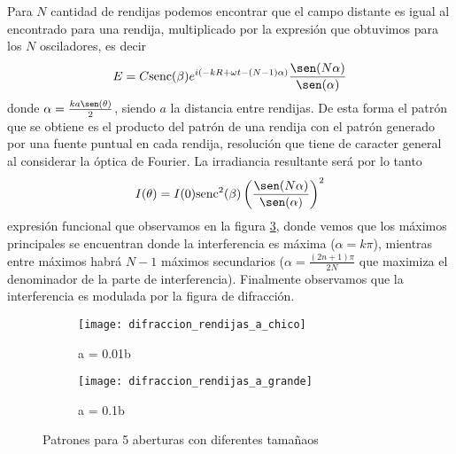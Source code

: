 \documentclass[a4paper]{article}
\numberwithin{equation}{section}
\begin{document}
	Para $N$ cantidad de rendijas podemos encontrar que el campo distante es igual al encontrado para una rendija, multiplicado por la expresión que obtuvimos para los $N$ osciladores, es decir
	\begin{equation}
		E = C \text{senc}(\beta) e^{i(-k R + \omega t - (N - 1)\alpha)} \frac{\sen(N \alpha)}{\sen(\alpha)}
		\label{eq:difraccion_red_rendijas}
	\end{equation}
	donde $\alpha = \frac{k a \sen(\theta)}{2}$, siendo $a$ la distancia entre rendijas. De esta forma el patrón que se obtiene es el producto del patrón de una rendija con el patrón generado por una fuente puntual en cada rendija, resolución que tiene de caracter general al considerar la óptica de Fourier. La irradiancia resultante será por lo tanto
	\begin{equation}
		I(\theta) = I(0) \text{senc}^2(\beta) \left(\frac{\sen(N\alpha)}{\sen(\alpha)}\right)^2
		\label{eq:difraccion_red_rendijas_irradiancia}
	\end{equation}
	expresión funcional que observamos en la figura \ref{fig:difraccion_red_rendijas_irradiancia}, donde vemos que los máximos principales se encuentran donde la interferencia es máxima ($\alpha = k \pi$), mientras entre máximos habrá $N - 1$ máximos secundarios ($\alpha = \frac{(2 n + 1)\pi}{2N}$ que maximiza el denominador de la parte de interferencia). Finalmente observamos que la interferencia es modulada por la figura de difracción.
	
	\begin{figure}[H]
        \centering
        \begin{subfigure}[b]{0.3\textwidth}
                \centering
                \texttt{[image: difraccion\_rendijas\_a\_chico]}
                \caption{a = 0.01b}
                \label{fig:difraccion_red_rendija_a_chico}
        \end{subfigure}
        \qquad
        \begin{subfigure}[b]{0.3\textwidth}
                \centering
                \texttt{[image: difraccion\_rendijas\_a\_grande]}
                \caption{a = 0.1b}
                \label{fig:difraccion_red_rendija_a_grande}
        \end{subfigure}
        \caption{Patrones para 5 aberturas con diferentes tamañaos}\label{fig:difraccion_red_rendijas_irradiancia}
\end{figure}
	
\end{document}
